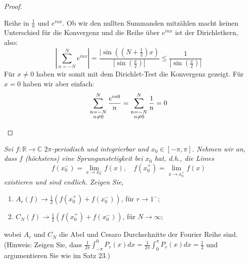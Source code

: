 \documentclass[11pt]{article}
\newenvironment{problem}[2][Beispiel]{
    \begin{trivlist}
        \item[\hskip \labelsep {\bfseries #1}\hskip \labelsep {\bfseries #2.}] \itshape}{
    \end{trivlist}\normalshape
}
\begin{document}
\begin{proof}
\begin{enumerate}[label = (\alph*)]
            Reihe in $\frac{1}{n}$ und $e^{inx}$. Ob wir den nullten Summanden mitzählen macht keinen
            Unterschied für die Konvergenz und die Reihe über $e^{inx}$ ist der Dirichletkern, also:
            $$\left|\sum_{n=-N}^N e^{inx}\right| = \frac{|\sin((N+\frac{1}{2})x)}{|\sin(\frac{x}{2})|}
            \leq \frac{1}{|\sin(\frac{x}{2})|}$$
            Für $x\neq 0$ haben wir somit mit dem Dirichlet-Test die Konvergenz gezeigt. Für $x=0$ haben
            wir aber einfach:
            $$\sum_{
            \begin{subarray}{c}
                n=-N\\n\neq 0
            \end{subarray}
            }^N\frac{e^{in0}}{n}=\sum_{
            \begin{subarray}{c}
                  n=-N\\n\neq 0
            \end{subarray}
            }^N\frac{1}{n}=0$$
        \end{enumerate}
    \end{proof}

    \begin{problem}{2}
        Sei $f: \mathbb{R} \rightarrow \mathbb{C} \,\,2 \pi$-periodisch und integrierbar und
        $x_0 \in[-\pi, \pi]$. Nehmen wir an, dass $f$ (höchstens) eine Sprungunstetigkeit bei $x_0$ hat,
        d.h., die Limes
        $$
        f\left(x_0^{-}\right)=\lim _{x \rightarrow x_0^{-}} f(x), \quad f\left(x_0^{+}\right)=\lim _{x
        \rightarrow x_0^{+}} f(x)
        $$
        existieren und sind endlich. Zeigen Sie,
        \begin{enumerate}[label = (\alph*)]
            \item $A_r(f) \rightarrow \frac{1}{2}\left(f\left(x_0^{+}\right)+f\left(x_0^{-}\right)\right)$,
            für $r \rightarrow 1^{-}$;
            \item $C_N(f) \rightarrow \frac{1}{2}\left(f\left(x_0^{+}\right)+f\left(x_0^{-}\right)\right)$,
            für $N \rightarrow \infty$;
        \end{enumerate}
        wobei $A_r$ und $C_N$ die Abel und Cesaro Durchschnitte der Fourier Reihe sind.
        (Hinweis: Zeigen Sie, dass $\frac{1}{2 \pi} \int_{-\pi}^0 P_r(x) d x=\frac{1}{2 \pi}
        \int_0^\pi P_r(x) d x=\frac{1}{2}$ und argumentieren Sie wie im Satz 23.)
    \end{problem}
\end{document}
